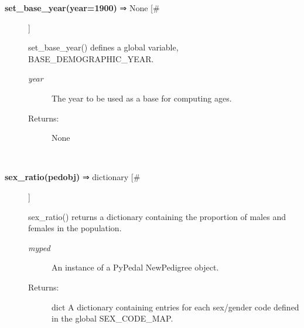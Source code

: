 \documentclass{article}
\begin{document}
\begin{description}
\item[\textbf{set\_base\_year(year=1900)} ⇒ None [\#]
]
\par set\_base\_year() defines a global variable, BASE\_DEMOGRAPHIC\_YEAR.
\begin{description}
\item[\textit{year}
]
The year to be used as a base for computing ages.
\item[Returns:
]
None
\end{description}\\

\item[\textbf{sex\_ratio(pedobj)} ⇒ dictionary [\#]
]
\par sex\_ratio() returns a dictionary containing the proportion of males and females in the population.
\begin{description}
\item[\textit{myped}
]
An instance of a PyPedal NewPedigree object.
\item[Returns:
]
dict A dictionary containing entries for each sex/gender code defined in the global SEX\_CODE\_MAP.
\end{description}\\

\end{description}
\end{document}
